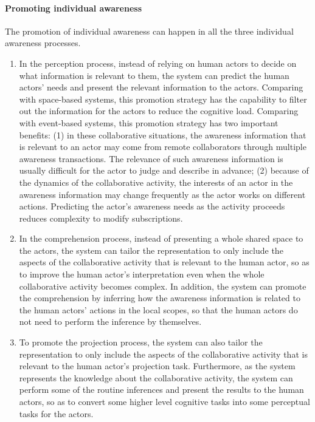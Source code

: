 \paragraph*{Promoting individual awareness} %
\label{par:promoting_individual_awareness}
The promotion of individual awareness can happen in all the three individual awareness processes. 
\begin{enumerate}
   \item In the perception process, instead of relying on human actors to decide on what information is relevant to them, the system can predict the human actors' needs and present the relevant information to the actors. Comparing with space-based systems, this promotion strategy has the capability to filter out the information for the actors to reduce the cognitive load. Comparing with event-based systems, this promotion strategy has two important benefits: (1) in these collaborative situations, the awareness information that is relevant to an actor may come from remote collaborators through multiple awareness transactions. The relevance of such awareness information is usually difficult for the actor to judge and describe in advance; (2) because of the dynamics of the collaborative activity, the interests of an actor in the awareness information may change frequently as the actor works on different actions. Predicting the actor's awareness needs as the activity proceeds reduces complexity to modify subscriptions.
   \item In the comprehension process, instead of presenting a whole shared space to the actors, the system can tailor the representation to only include the aspects of the collaborative activity that is relevant to the human actor, so as to improve the human actor's interpretation even when the whole collaborative activity becomes complex. In addition, the system can promote the comprehension by inferring how the awareness information is related to the human actors' actions in the local scopes, so that the human actors do not need to perform the inference by themselves.
   \item To promote the projection process, the system can also tailor the representation to only include the aspects of the collaborative activity that is relevant to the human actor's projection task. Furthermore, as the system represents the knowledge about the collaborative activity, the system can perform some of the routine inferences and present the results to the human actors, so as to convert some higher level cognitive tasks into some perceptual tasks for the actors.
\end{enumerate}

